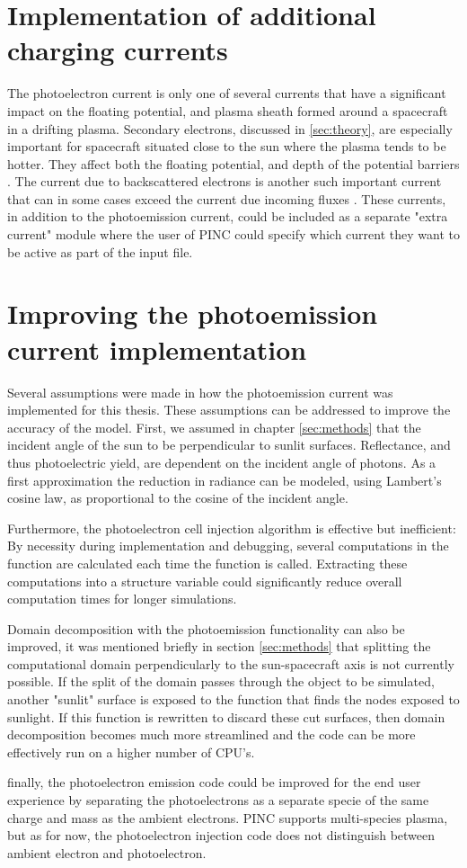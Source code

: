 \section{Implementation of additional charging currents}
The photoelectron current is only one of several currents that have a significant impact on the floating potential, and plasma sheath formed around a spacecraft in a drifting plasma. Secondary electrons, discussed in \cref{sec:theory}, are especially important for spacecraft situated close to the sun where the plasma tends to be hotter. They affect both the floating potential, and depth of the potential barriers \parencite{Deca2013}. The current due to backscattered electrons is another such important current that can in some cases exceed the current due incoming fluxes \parencite{Garrett1981}. These currents, in addition to the photoemission current, could be included as a separate "extra current" module where the user of PINC could specify which current they want to be active as part of the input file.

\section{Improving the photoemission current implementation}
Several assumptions were made in how the photoemission current was implemented for this thesis. These assumptions can be addressed to improve the accuracy of the model. First, we assumed in chapter \cref{sec:methods} that the incident angle of the sun to be perpendicular to sunlit surfaces. Reflectance, and thus photoelectric yield, are dependent on the incident angle of photons. As a first approximation the reduction in radiance can be modeled, using Lambert's cosine law, as proportional to the cosine of the incident angle. 

Furthermore, the photoelectron cell injection algorithm is effective but inefficient: By necessity during implementation and debugging, several computations in the function are calculated each time the function is called. Extracting these computations into a structure variable could significantly reduce overall computation times for longer simulations. 

Domain decomposition with the photoemission functionality can also be improved, it was mentioned briefly in section \cref{sec:methods} that splitting the computational domain perpendicularly to the sun-spacecraft axis is not currently possible. If the split of the domain passes through the object to be simulated, another "sunlit" surface is exposed to the function that finds the nodes exposed to sunlight. If this function is rewritten to discard these cut surfaces, then domain decomposition becomes much more streamlined and the code can be more effectively run on a higher number of CPU's.

finally, the photoelectron emission code could be improved for the end user experience by separating the photoelectrons as a separate specie of the same charge and mass as the ambient electrons. PINC supports multi-species plasma, but as for now, the photoelectron injection code does not distinguish between ambient electron and photoelectron.